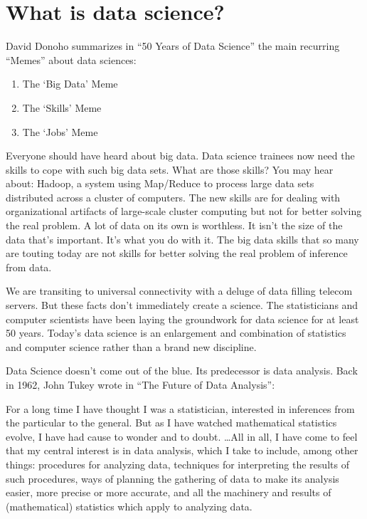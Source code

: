 \documentclass[12pt,]{krantz}
\providecommand{\tightlist}{%
  \setlength{\itemsep}{0pt}\setlength{\parskip}{0pt}}
\renewenvironment{quote}{\begin{VF}}{\end{VF}}
\theoremstyle{definition}
\theoremstyle{definition}
\theoremstyle{remark}
\begin{document}
\section{What is data science?}\label{what-is-data-science}

David Donoho \citep{data50} summarizes in ``50 Years of Data Science''
the main recurring ``Memes'' about data sciences:

\begin{enumerate}
\def\labelenumi{\arabic{enumi}.}
\tightlist
\item
  The `Big Data' Meme
\item
  The `Skills' Meme
\item
  The `Jobs' Meme
\end{enumerate}

Everyone should have heard about big data. Data science trainees now
need the skills to cope with such big data sets. What are those skills?
You may hear about: Hadoop, a system using Map/Reduce to process large
data sets distributed across a cluster of computers. The new skills are
for dealing with organizational artifacts of large-scale cluster
computing but not for better solving the real problem. A lot of data on
its own is worthless. It isn't the size of the data that's important.
It's what you do with it. The big data skills that so many are touting
today are not skills for better solving the real problem of inference
from data.

We are transiting to universal connectivity with a deluge of data
filling telecom servers. But these facts don't immediately create a
science. The statisticians and computer scientists have been laying the
groundwork for data science for at least 50 years. Today's data science
is an enlargement and combination of statistics and computer science
rather than a brand new discipline.

Data Science doesn't come out of the blue. Its predecessor is data
analysis. Back in 1962, John Tukey wrote in ``The Future of Data
Analysis'':

\begin{quote}
For a long time I have thought I was a statistician, interested in
inferences from the particular to the general. But as I have watched
mathematical statistics evolve, I have had cause to wonder and to doubt.
\ldots{}All in all, I have come to feel that my central interest is in
data analysis, which I take to include, among other things: procedures
for analyzing data, techniques for interpreting the results of such
procedures, ways of planning the gathering of data to make its analysis
easier, more precise or more accurate, and all the machinery and results
of (mathematical) statistics which apply to analyzing data.
\end{quote}
\end{document}
